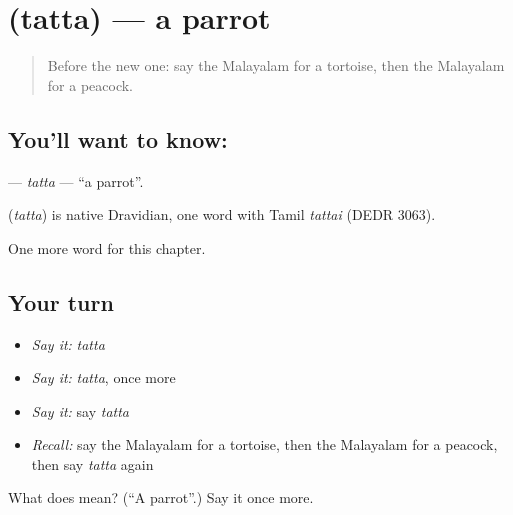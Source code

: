 \section[\texorpdfstring{\ml{തത്ത} (tatta)}{തത്ത (tatta)}]{ (tatta) — a parrot}

\label{lesson:ML-C152-tatta}



\begin{quote}
Before the new one: say the Malayalam for a tortoise, then the Malayalam for a peacock.
\end{quote}

\subsection*{You'll want to know: }
\textbf{} — \emph{tatta} — \textquotedblleft{}a parrot\textquotedblright{}.

\begin{cousinweb}
\textbf{} (\emph{tatta}) is native Dravidian, one word with Tamil \emph{tattai} (DEDR 3063).
\end{cousinweb}

\begin{grammarlens}[title={What you've built}]
One more word for this chapter.
\end{grammarlens}

\subsection*{Your turn}
\begin{itemize}
\raggedright
  \item \emph{Say it:} \emph{tatta}
  \item \emph{Say it:} \emph{tatta}, once more
  \item \emph{Say it:} say \emph{tatta}
  \item \emph{Recall:} say the Malayalam for a tortoise, then the Malayalam for a peacock, then say \emph{tatta} again
\end{itemize}

\begin{tcolorbox}[breakable,colback=teal!4,colframe=teal!35!black,title={Before you move on}]
What does  mean? (\textquotedblleft{}A parrot\textquotedblright{}.) Say it once more.
\end{tcolorbox}

